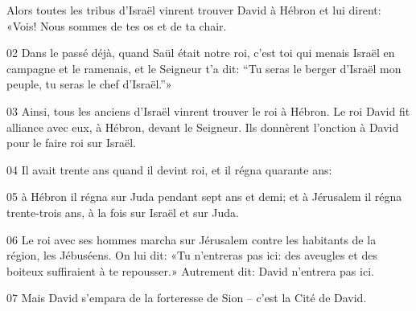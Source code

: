 Alors toutes les tribus d’Israël vinrent trouver David à Hébron et lui dirent: «Vois! Nous sommes de tes os et de ta chair.

02 Dans le passé déjà, quand Saül était notre roi, c’est toi qui menais Israël en campagne et le ramenais, et le Seigneur t’a dit: “Tu seras le berger d’Israël mon peuple, tu seras le chef d’Israël.”»

03 Ainsi, tous les anciens d’Israël vinrent trouver le roi à Hébron. Le roi David fit alliance avec eux, à Hébron, devant le Seigneur. Ils donnèrent l’onction à David pour le faire roi sur Israël.

04 Il avait trente ans quand il devint roi, et il régna quarante ans:

05 à Hébron il régna sur Juda pendant sept ans et demi; et à Jérusalem il régna trente-trois ans, à la fois sur Israël et sur Juda.

06 Le roi avec ses hommes marcha sur Jérusalem contre les habitants de la région, les Jébuséens. On lui dit: «Tu n’entreras pas ici: des aveugles et des boiteux suffiraient à te repousser.» Autrement dit: David n’entrera pas ici.

07 Mais David s’empara de la forteresse de Sion – c’est la Cité de David.